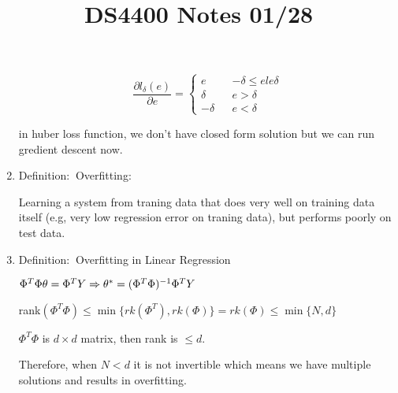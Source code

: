 \documentclass[12pt]{article}
\newcommand{\defi}{{\color{blue} Definition: $\ $}}
\begin{document}
\begin{enumerate}
             $$
             \frac{\partial l_{\delta}(e)}{\partial e} = 
             \left\{
                 \begin{array}{rcl}
                    e & & -\delta \le e le \delta\\
                    \delta & & e > \delta\\
                    -\delta & & e < \delta
                 \end{array}
             \right.
             $$

             in huber loss function, we don't have closed form solution but we can run gredient descent now.

             \item \defi Overfitting: 
             
             Learning a system from traning data that does very well on training data itself (e.g, very low regression error on traning data), but performs poorly on test data.

             \item \defi Overfitting in Linear Regression
             
             $\Phi^T \Phi \theta = \Phi^T Y \\ 
             \Rightarrow \theta^* = (\Phi^T \Phi)^{-1} \Phi^T Y$

             rank$(\Phi^T \Phi) \le \min \{rk(\Phi^T), rk(\Phi)\} = rk(\Phi) \le \min\{N,d\}$

             $\Phi^T\Phi$ is $d\times d$ matrix, then rank is $\le d$.

             Therefore, when $N < d$ it is not invertible which means we have multiple solutions and results in overfitting.
        \end{enumerate}
        \title{DS4400 Notes 01/28}
        \maketitle
\end{document}
